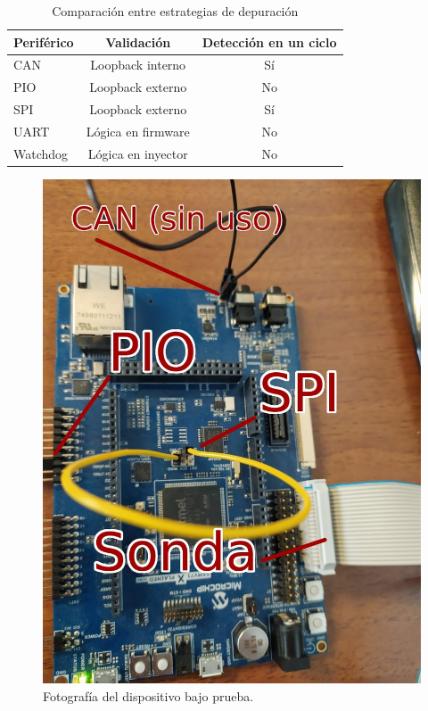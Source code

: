 \begin{table}[h]
	\centering
	\caption[Estrategias de depuración]{Comparación entre estrategias de depuración}

	\begin{tabular}{l c c}    
		\toprule
        \textbf{Periférico} & \textbf{Validación}       & \textbf{Detección en un ciclo}\\
		\midrule
		CAN                 & Loopback interno          & Sí\\		
		PIO                 & Loopback externo          & No\\
		SPI                 & Loopback externo          & Sí\\
		UART                & Lógica en firmware        & No\\
		Watchdog            & Lógica en inyector        & No\\
		\bottomrule
		\hline
	\end{tabular}
	\label{tab:perifericos}
\end{table}

\begin{figure}[htbp]
	\centering
	\includegraphics[width=\textwidth]{./Figures/labo.jpeg}
    \caption{Fotografía del dispositivo bajo prueba.}
	\label{fig:labo}
\end{figure}

